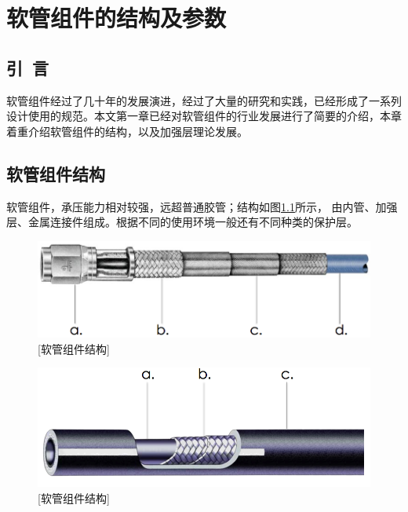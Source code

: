 
\chapter{软管组件的结构及参数}
\section{引~言}
软管组件经过了几十年的发展演进，经过了大量的研究和实践，已经形成了一系列设计使用的规范。本文第一章已经对软管组件的行业发展进行了简要的介绍，本章着重介绍软管组件的结构，以及加强层理论发展。

\section{软管组件结构}
软管组件，承压能力相对较强，远超普通胶管；结构如图\ref{fig:hose structure-1}所示，
由内管、加强层、金属连接件组成。根据不同的使用环境一般还有不同种类的保护层。



\begin{figure}[!htbp]
	\centering
	\includegraphics[width=0.6\linewidth]{figure/chap1/Hose-Structure}
	[软管组件结构]
	\label{fig:hose structure-1}
\end{figure}

\begin{figure}[!htbp]
	\centering
	\includegraphics[width=0.6\linewidth]{figure/chap1/Parker-hose}
	[软管组件结构]
	\label{fig:hose structure-2}
\end{figure}

